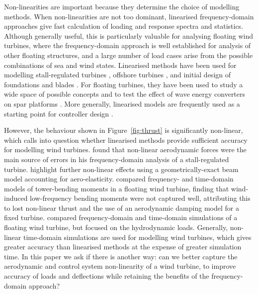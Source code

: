 \documentclass[a4paper,preprint]{elsarticle}
\begin{document}
Non-linearities are important because they determine the choice of modelling
methods. When non-linearities are not too dominant, linearised frequency-domain
approaches give fast calculation of loading and response spectra and statistics.
Although generally useful, this is particularly valuable for analysing floating
wind turbines, where the frequency-domain approach is well established for
analysis of other floating structures, and a large number of load cases arise
from the possible combinations of sea and wind states. Linearised methods have
been used for modelling stall-regulated turbines
\citep{Halfpenny1998,merz_simple_2012}, offshore turbines
\citep{VanEngelen2004}, and initial design of foundations
\citep{vandermale_effect_2016} and blades \citep{dura_fast_2017}. For floating
turbines, they have been used to study a wide space of possible concepts
\citep{hall_evolving_2013} and to test the effect of wave energy converters on
spar platforms \citep{kluger_reducedorder_2016}. More generally, linearised
models are frequently used as a starting point for controller design
\citep{Burton2011}.

However, the behaviour shown in Figure~\ref{fig:thrust} is significantly
non-linear, which calls into question whether linearised methods provide
sufficient accuracy for modelling wind turbines. \citet{Halfpenny1998} found
that non-linear aerodynamic forces were the main source of errors in his
frequency-domain analysis of a stall-regulated turbine.
\citet{sabale_nonlinear_2019} highlight further non-linear effects using a
geometrically-exact beam model accounting for aero-elasticity.
\citet{kvittem_frequency_2014} compared frequency- and time-domain models of
tower-bending moments in a floating wind turbine, finding that wind-induced
low-frequency bending moments were not captured well, attributing this to lost
non-linear thrust and the use of an aerodynamic damping model for a fixed
turbine. \citet{philippe_comparison_2011} compared frequency-domain and
time-domain simulations of a floating wind turbine, but focused on the
hydrodynamic loads. Generally, non-linear time-domain simulations are used for
modelling wind turbines, which gives greater accuracy than linearised methods at
the expense of greater simulation time. In this paper we ask if there is another
way: can we better capture the aerodynamic and control system non-linearity of a
wind turbine, to improve accuracy of loads and deflections while retaining the
benefits of the frequency-domain approach?
\end{document}

